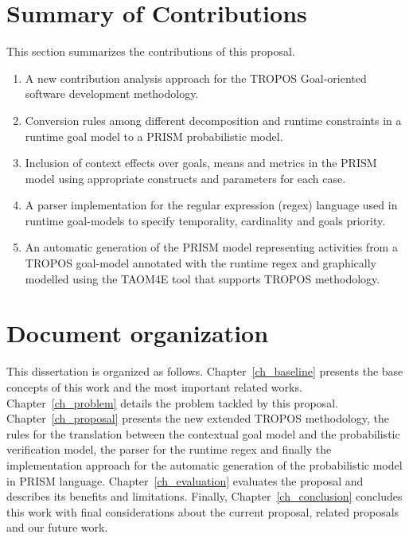 
\section{Summary of Contributions}

This section summarizes the contributions of this proposal.


\begin{enumerate}

\item A new contribution analysis approach for the TROPOS Goal-oriented software development methodology.

\item Conversion rules among different decomposition and runtime constraints in a runtime goal model to a PRISM probabilistic model.

\item Inclusion of context effects over goals, means and metrics in the PRISM model using appropriate constructs and parameters for each case.

\item A parser implementation for the regular expression (regex) language used in runtime goal-models to specify temporality, cardinality and goals priority. 

\item An automatic generation of the PRISM model representing activities from a TROPOS goal-model annotated with the runtime regex and graphically modelled using the TAOM4E tool that supports TROPOS methodology.

\end{enumerate}

\section{Document organization}

This dissertation is organized as follows. Chapter~\ref{ch_baseline} presents the base concepts of this work and the most important related works. Chapter~\ref{ch_problem} details the problem tackled by this proposal. Chapter~\ref{ch_proposal} presents the new extended TROPOS methodology, the rules for the translation between the contextual goal model and the probabilistic verification model, the parser for the runtime regex and finally the implementation approach for the automatic generation of the probabilistic model in PRISM language. Chapter~\ref{ch_evaluation} evaluates the proposal and describes its benefits and limitations. Finally, Chapter~\ref{ch_conclusion} concludes this work with final considerations about the current proposal, related proposals and our future work.
